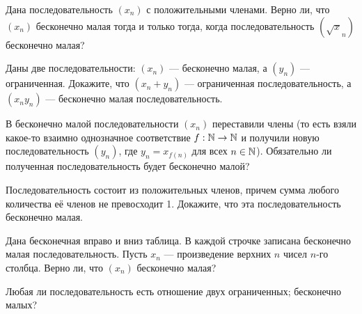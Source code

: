 \documentclass[a4paper, 11pt]{article}
\begin{document}

 Дана последовательность $(x_n)$ с положительными членами.
Верно ли, что $(x_n)$ бесконечно малая
тогда и только тогда, когда последовательность $(\sqrt x_n)$
бесконечно малая?

 Даны две последовательности: $(x_n)$ --- бесконечно малая,
а $(y_n)$ --- ограниченная.
Докажите, что  $(x_n+y_n)$ --- ограниченная последовательность,
а $(x_ny_n)$ --- бесконечно малая последовательность.

 В бесконечно малой последовательности $(x_n)$
переставили члены (то есть взяли какое-то взаимно однозначное соответствие
$f:\mathbb{N}\rightarrow\mathbb{N}$ и получили новую последовательность $(y_n)$,
где $y_n=x_{f(n)}$ для всех $n\in\mathbb{N}$).
Обязательно ли полученная последовательность
будет бесконечно малой?



 Последовательность состоит из положительных
членов, причем сумма любого количества е\"е членов не превосходит 1.
Докажите, что эта последовательность бесконечно малая.




Дана бесконечная вправо и вниз таблица.
В каждой строчке записана бесконечно малая последовательность.
Пусть $x_n$ --- произведение верхних $n$ чисел $n$-го столбца.
Верно ли, что $(x_n)$ бесконечно малая?



 Любая ли последовательность есть отношение двух
 ограниченных;
 бесконечно малых? %








\end{document}
